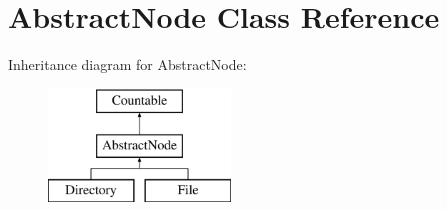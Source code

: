 \hypertarget{class_sebastian_bergmann_1_1_code_coverage_1_1_node_1_1_abstract_node}{}\section{Abstract\+Node Class Reference}
\label{class_sebastian_bergmann_1_1_code_coverage_1_1_node_1_1_abstract_node}
Inheritance diagram for Abstract\+Node\+:\begin{figure}[H]
\begin{center}
\leavevmode
\includegraphics[height=3.000000cm]{class_sebastian_bergmann_1_1_code_coverage_1_1_node_1_1_abstract_node}
\end{center}
\end{figure}
